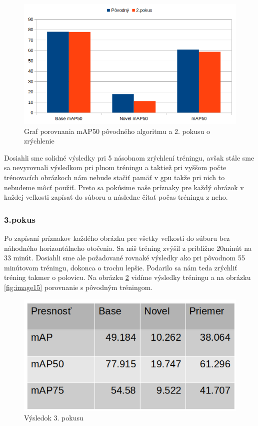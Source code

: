 \begin{figure}[H]
\centering
\includegraphics[width=\textwidth]{images/faster_2attempt_chart.png}
\caption{Graf porovnania mAP50 pôvodného algoritmu a 2. pokusu o zrýchlenie}
\label{fig:image13}
\end{figure}

Dosiahli sme solidné výsledky pri 5 násobnom zrýchlení tréningu, avšak stále sme sa nevyrovnali výsledkom pri plnom tréningu a taktiež pri vyššom počte trénovacích obrázkoch nám nebude stačiť pamäť v gpu takže pri nich to nebudeme môcť použiť. Preto sa pokúsime naše príznaky pre každý obrázok v každej veľkosti zapísať do súboru a následne čítať počas tréningu z neho. 

\subsubsection{3.pokus}

Po zapísaní príznakov každého obrázku pre všetky veľkosti do súboru bez náhodného horizontálneho otočenia. Sa náš tréning zvýšil z približne 20minút na 33 minút. Dosiahli sme ale požadované rovnaké výsledky ako pri pôvodnom 55 minútovom tréningu, dokonca o trochu lepšie. Podarilo sa nám teda zrýchliť tréning takmer o polovicu. Na obrázku \ref{fig:image14} vidíme výsledky tréningu a na obrázku \ref{fig:image15} porovnanie s pôvodným tréningom. 

\begin{figure}[H]
\centering
\includegraphics[width=\textwidth]{images/faster_3attempt_table.png}
\caption{Výsledok 3. pokusu}
\label{fig:image14}
\end{figure}

